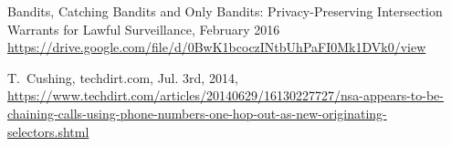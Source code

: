 \documentclass[USenglish,oneside,twocolumn]{article}
\begin{document}






%


\begin{thebibliography}{99}


\baselineskip %

 Bandits, Catching Bandits and Only Bandits:
Privacy-Preserving Intersection Warrants for Lawful Surveillance,
February 2016 \url{https://drive.google.com/file/d/0BwK1bcoczINtbUhPaFI0Mk1DVk0/view}


 T.~Cushing, techdirt.com, Jul. 3rd, 2014, \url{https://www.techdirt.com/articles/20140629/16130227727/nsa-appears-to-be-chaining-calls-using-phone-numbers-one-hop-out-as-new-originating-selectors.shtml}


\end{thebibliography}
\end{document}

